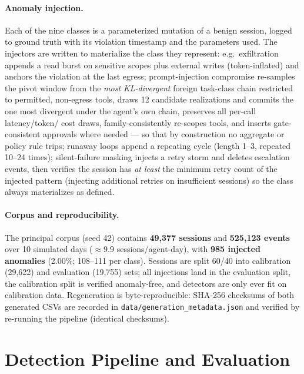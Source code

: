 \documentclass[10pt]{article}
\newcommand{\code}[1]{\texttt{#1}}
\begin{document}
\paragraph{Anomaly injection.} Each of the nine classes is a parameterized
mutation of a benign session, logged to ground truth with its violation
timestamp and the parameters used. The injectors are written to materialize
the class they represent: e.g.\ exfiltration appends a read burst on sensitive
scopes plus external writes (token-inflated) and anchors the violation at the
last egress; prompt-injection compromise re-samples the pivot window from the
\emph{most KL-divergent} foreign task-class chain restricted to permitted,
non-egress tools, draws 12 candidate realizations and commits the one most
divergent under the agent's own chain, preserves all per-call latency/token/
cost draws, family-consistently re-scopes tools, and inserts gate-consistent
approvals where needed --- so that by construction no aggregate or policy rule
trips; runaway loops append a repeating cycle (length 1--3, repeated 10--24
times); silent-failure masking injects a retry storm and deletes escalation
events, then verifies the session has \emph{at least} the minimum retry count
of the injected pattern (injecting additional retries on insufficient
sessions) so the class always materializes as defined.

\paragraph{Corpus and reproducibility.} The principal corpus (seed 42) contains
\textbf{49{,}377 sessions} and \textbf{525{,}123 events} over 10 simulated days
($\approx$9.9 sessions/agent-day), with \textbf{985 injected anomalies}
(2.00\%; 108--111 per class). Sessions are split 60/40 into calibration
(29{,}622) and evaluation (19{,}755) sets; all injections land in the
evaluation split, the calibration split is verified anomaly-free, and
detectors are only ever fit on calibration data. Regeneration is
byte-reproducible: SHA-256 checksums of both generated CSVs are recorded in
\code{data/generation\_metadata.json} and verified by re-running the pipeline
(identical checksums).

\section{Detection Pipeline and Evaluation}
\label{sec:detection}
\end{document}
